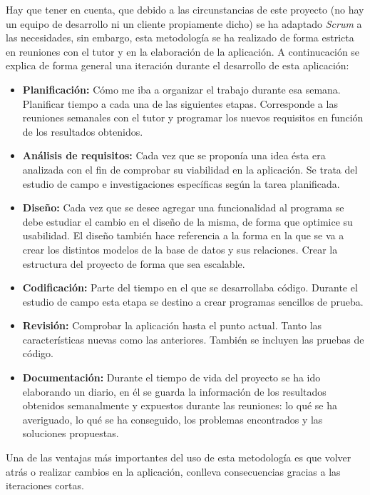 Hay que tener en cuenta, que debido a las circunstancias de este proyecto (no hay un equipo de desarrollo ni un cliente propiamente dicho) se ha adaptado \emph{Scrum} a las necesidades, sin embargo, esta metodología se ha realizado de forma estricta en reuniones con el tutor y en la elaboración de la aplicación. A continucación se explica de forma general una iteración durante el desarrollo de esta aplicación:
\begin{itemize}
	\item \textbf{Planificación:} Cómo me iba a organizar el trabajo durante esa semana. Planificar tiempo a cada una de las siguientes etapas. Corresponde a las reuniones semanales con el tutor y programar los nuevos requisitos en función de los resultados obtenidos.
	\item \textbf{Análisis de requisitos:} Cada vez que se proponía una idea ésta era analizada con el fin de comprobar su viabilidad en la aplicación. Se trata del estudio de campo e investigaciones específicas según la tarea planificada.
	\item \textbf{Diseño:} Cada vez que se desee agregar una funcionalidad al programa se debe estudiar el cambio en el diseño de la misma, de forma que optimice su usabilidad. El diseño también hace referencia a la forma en la que se va a crear los distintos modelos de la base de datos y sus relaciones. Crear la estructura del proyecto de forma que sea escalable.
	\item \textbf{Codificación:} Parte del tiempo en el que se desarrollaba código. Durante el estudio de campo esta etapa se destino a crear programas sencillos de prueba.
	\item \textbf{Revisión:} Comprobar la aplicación hasta el punto actual. Tanto las características nuevas como las anteriores. También se incluyen las pruebas de código.
	\item \textbf{Documentación:} Durante el tiempo de vida del proyecto se ha ido elaborando un diario, en él se guarda la información de los resultados obtenidos semanalmente y expuestos durante las reuniones: lo qué se ha averiguado, lo qué se ha conseguido, los problemas encontrados y las soluciones propuestas.
\end{itemize}

Una de las ventajas más importantes del uso de esta metodología es que volver atrás o realizar cambios en la aplicación, conlleva consecuencias gracias a las iteraciones cortas. \\

\vspace*{0.2in}
